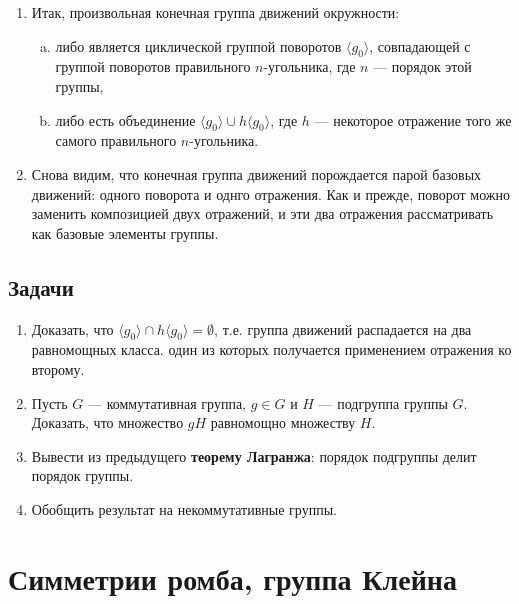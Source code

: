 \begin{enumerate}
\item Итак, произвольная конечная группа движений окружности:
\begin{enumerate}[a)]
\item либо является циклической группой поворотов $\langle g_0\rangle$, совпадающей с группой поворотов правильного $n$-угольника, где $n$ --- порядок этой группы,
\item либо есть объединение $\langle g_0\rangle\cup h\langle g_0\rangle$, где $h$ --- некоторое отражение того же самого правильного $n$-угольника.
\end{enumerate}
\item Снова видим, что конечная группа движений порождается парой базовых движений: одного поворота и однго отражения. Как и прежде, поворот можно заменить композицией двух отражений, и эти два отражения рассматривать как базовые элементы группы.
\end{enumerate}

\subsection{Задачи}
\begin{enumerate}
\item Доказать, что $\langle g_0\rangle\cap h\langle g_0\rangle = \emptyset$, т.е. группа движений распадается на два равномощных класса. один из которых получается применением отражения ко второму.
\item Пусть $G$ --- коммутативная группа, $g\in G$ и $H$ --- подгруппа группы $G$. Доказать, что множество $gH$ равномощно множеству $H$.
\item Вывести из предыдущего \textbf{теорему Лагранжа}: порядок подгруппы делит порядок группы.
\item Обобщить результат на некоммутативные группы.
\end{enumerate}

\section{Симметрии ромба, группа Клейна}

